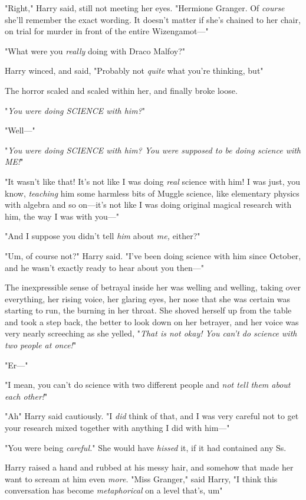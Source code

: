 "Right," Harry said, still not meeting her eyes. "Hermione Granger. Of
\emph{course} she'll remember the exact wording. It doesn't matter if she's
chained to her chair, on trial for murder in front of the entire Wizengamot\mbox{---}"

"What were you \emph{really} doing with Draco Malfoy?"

Harry winced, and said, "Probably not \emph{quite} what you're thinking,
but{\el}"

The horror scaled and scaled within her, and finally broke loose.

"\emph{You were doing SCIENCE with him?}"

"Well\mbox{---}"

"\emph{You were doing SCIENCE with him? You were supposed to be doing science
with ME!}"

"It wasn't like that! It's not like I was doing \emph{real} science with him! I
was just, you know, \emph{teaching} him some harmless bits of Muggle science,
like elementary physics with algebra and so on---it's not like I was doing
original magical research with him, the way I was with you\mbox{---}"

"And I suppose you didn't tell \emph{him} about \emph{me,} either?"

"Um, of course not?" Harry said. "I've been doing science with him since
October, and he wasn't exactly ready to hear about you then\mbox{---}"

The inexpressible sense of betrayal inside her was welling and welling, taking
over everything, her rising voice, her glaring eyes, her nose that she was
certain was starting to run, the burning in her throat. She shoved herself up
from the table and took a step back, the better to look down on her betrayer,
and her voice was very nearly screeching as she yelled, "\emph{That is not
okay! You can't do science with two people at once!}"

"Er\mbox{---}"

"I mean, you can't do science with two different people and \emph{not tell them
about each other!}"

"Ah{\el}" Harry said cautiously. "I \emph{did} think of that, and I was very
careful not to get your research mixed together with anything I did with him\mbox{---}"

"You were being \emph{careful.}" She would have \emph{hissed} it, if it had
contained any Ss.

Harry raised a hand and rubbed at his messy hair, and somehow that made her
want to scream at him even \emph{more.} "Miss Granger," said Harry, "I think
this conversation has become \emph{metaphorical} on a level that's, um{\el}"

